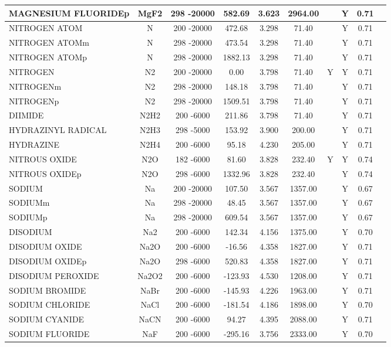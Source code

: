 \begin{longtable}{@{\extracolsep{\fill}}|l|c|c|c|c|c|c|c|c|l|}
MAGNESIUM FLUORIDEp&MgF2&298 -20000&  582.69& 3.623&  2964.00& &Y& 0.71&\\ \hline
NITROGEN ATOM&N&200 -20000&  472.68& 3.298&    71.40& &Y& 0.71&\\ \hline
NITROGEN ATOMm&N&298 -20000&  473.54& 3.298&    71.40& &Y& 0.71&\\ \hline
NITROGEN ATOMp&N&298 -20000& 1882.13& 3.298&    71.40& &Y& 0.71&\\ \hline
NITROGEN&N2&200 -20000&    0.00& 3.798&    71.40&Y&Y& 0.71&\\ \hline
NITROGENm&N2&298 -20000&  148.18& 3.798&    71.40& &Y& 0.71&\\ \hline
NITROGENp&N2&298 -20000& 1509.51& 3.798&    71.40& &Y& 0.71&\\ \hline
DIIMIDE&N2H2&200 -6000&  211.86& 3.798&    71.40& &Y& 0.71&\\ \hline
HYDRAZINYL RADICAL&N2H3&298 -5000&  153.92& 3.900&   200.00& &Y& 0.71&\\ \hline
HYDRAZINE&N2H4&200 -6000&   95.18& 4.230&   205.00& &Y& 0.71&\\ \hline
NITROUS OXIDE&N2O&182 -6000&   81.60& 3.828&   232.40&Y&Y& 0.74&\\ \hline
NITROUS OXIDEp&N2O&298 -6000& 1332.96& 3.828&   232.40& &Y& 0.74&\\ \hline
SODIUM&Na&200 -20000&  107.50& 3.567&  1357.00& &Y& 0.67&\\ \hline
SODIUMm&Na&298 -20000&   48.45& 3.567&  1357.00& &Y& 0.67&\\ \hline
SODIUMp&Na&298 -20000&  609.54& 3.567&  1357.00& &Y& 0.67&\\ \hline
DISODIUM&Na2&200 -6000&  142.34& 4.156&  1375.00& &Y& 0.70&\\ \hline
DISODIUM OXIDE&Na2O&200 -6000&  -16.56& 4.358&  1827.00& &Y& 0.71&\\ \hline
DISODIUM OXIDEp&Na2O&298 -6000&  520.83& 4.358&  1827.00& &Y& 0.71&\\ \hline
DISODIUM PEROXIDE&Na2O2&200 -6000& -123.93& 4.530&  1208.00& &Y& 0.71&\\ \hline
SODIUM BROMIDE&NaBr&200 -6000& -145.93& 4.226&  1963.00& &Y& 0.71&\\ \hline
SODIUM CHLORIDE&NaCl&200 -6000& -181.54& 4.186&  1898.00& &Y& 0.70&\\ \hline
SODIUM CYANIDE&NaCN&200 -6000&   94.27& 4.395&  2088.00& &Y& 0.71&\\ \hline
SODIUM FLUORIDE&NaF&200 -6000& -295.16& 3.756&  2333.00& &Y& 0.70&\\ \hline

\end{longtable}
